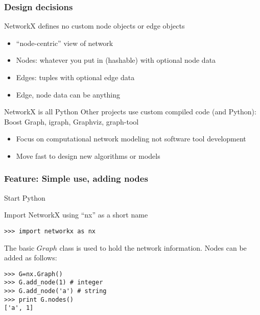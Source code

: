 \begin{frame}[fragile]
\frametitle{Design decisions}

\begin{block}
{NetworkX defines no custom node objects or edge objects}

\begin{itemize}
\item ``node-centric'' view of network

\item Nodes: whatever you put in (hashable) with optional node data

\item Edges: tuples with optional edge data

\item Edge, node data can be anything

\end{itemize}
\end{block}

\begin{block}
{NetworkX is all Python}
Other projects use custom compiled code (and Python): Boost Graph,
  igraph, Graphviz, graph-tool

\begin{itemize}
\item Focus on computational network modeling not software tool development

\item Move fast to design new algorithms or models


\end{itemize}
\end{block}


\end{frame}



\begin{frame}[fragile]
\frametitle{Feature: Simple use, adding nodes}

Start Python

Import NetworkX using ``nx'' as a short name
\begin{block}{}
\begin{verbatim}
>>> import networkx as nx
\end{verbatim}
\end{block}
The basic $Graph$ class is used to hold the network information.
Nodes can be added as follows:
\begin{block}{}
\begin{verbatim}
>>> G=nx.Graph()
>>> G.add_node(1) # integer
>>> G.add_node('a') # string
>>> print G.nodes()
['a', 1]
\end{verbatim}
\end{block}

\end{frame}


